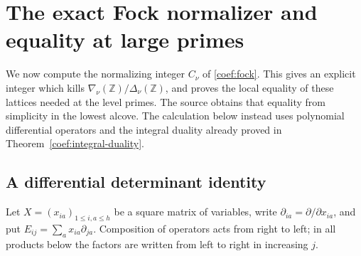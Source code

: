 \section{The exact Fock normalizer and equality at large primes}
\label{fh-section}

We now compute the normalizing integer $C_\nu$ of
\eqref{coef:fock}. This gives an explicit integer which kills
$\nabla_\nu(\mathbb Z)/\Delta_\nu(\mathbb Z)$, and proves the
local equality of these lattices needed at the level primes.
The source obtains that equality from simplicity in the lowest
alcove.\cite{alpo-uniform-source} The calculation below instead
uses polynomial differential operators and the integral duality
already proved in Theorem~\ref{coef:integral-duality}.

\subsection{A differential determinant identity}

Let $X=(x_{ia})_{1\le i,a\le h}$ be a square matrix of variables,
write $\partial_{ia}=\partial/\partial x_{ia}$, and put
$E_{ij}=\sum_a x_{ia}\partial_{ja}$.
Composition of operators acts from right to left; in all products
below the factors are written from left to right in increasing $j$.

